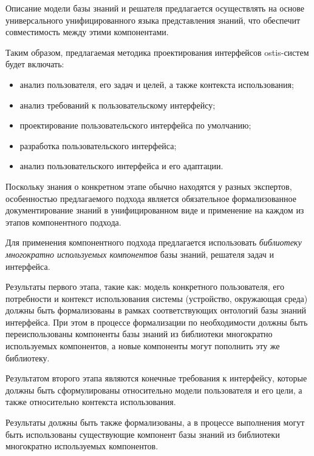 Описание модели базы знаний и решателя предлагается осуществлять на основе универсального унифицированного языка представления знаний, что обеспечит совместимость между этими компонентами.

Таким образом, предлагаемая методика проектирования интерфейсов ostis-систем будет включать:
\begin{itemize}
\item анализ пользователя, его задач и целей, а также контекста использования;
\item анализ требований к пользовательскому интерфейсу;
\item проектирование пользовательского интерфейса по умолчанию;
\item разработка пользовательского интерфейса;
\item анализ пользовательского интерфейса и его адаптации.
\end{itemize}

Поскольку знания о конкретном этапе обычно находятся у разных экспертов, особенностью предлагаемого подхода является обязательное формализованное документирование знаний в унифицированном виде и применение на каждом из этапов компонентного подхода.

Для применения компонентного подхода предлагается использовать \textit{библиотеку многократно используемых компонентов} базы знаний, решателя задач и интерфейса.


Результаты первого этапа, такие как: модель конкретного пользователя, его потребности и контекст использования системы (устройство, окружающая среда) должны быть формализованы в рамках соответствующих онтологий базы знаний интерфейса. 
При этом в процессе формализации по необходимости должны быть переиспользованы компоненты базы знаний из библиотеки многократно используемых компонентов, а новые компоненты могут пополнить эту же библиотеку.


Результатом второго этапа являются конечные требования к интерфейсу, которые должны быть сформулированы относительно модели пользователя и его цели, а также относительно контекста использования.

Результаты должны быть также формализованы, а в процессе выполнения могут быть использованы существующие компонент базы знаний из библиотеки многократно используемых компонентов.

